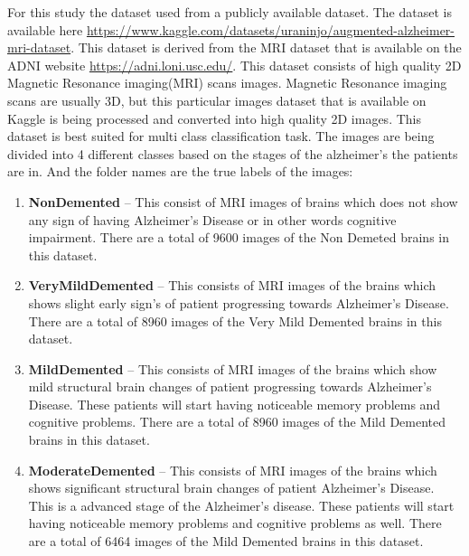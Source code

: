 \documentclass[12pt,onecolumn]{report}
\begin{document}
For this study the dataset used from a publicly available dataset. The dataset is available here \url{https://www.kaggle.com/datasets/uraninjo/augmented-alzheimer-mri-dataset}. This dataset is derived from the MRI dataset that is available on the ADNI website \url{https://adni.loni.usc.edu/}. This dataset consists of high quality 2D Magnetic Resonance imaging(MRI) scans images. Magnetic Resonance imaging scans are usually 3D, but this particular images dataset that is available on Kaggle is being processed and converted into high quality 2D images. This dataset is best suited for multi class classification task. The images are being divided into 4 different classes based on the stages of the alzheimer's the patients are in. And the folder names are the true labels of the images:
\begin{enumerate}
    \item \textbf{NonDemented} – This consist of MRI images of brains which does not show any sign of having Alzheimer’s Disease or in other words cognitive impairment. There are a total of 9600 images of the Non Demeted brains in this dataset.
    \item \textbf{VeryMildDemented} – This consists of MRI images of the brains which shows slight early sign's of patient progressing towards Alzheimer’s Disease. There are a total of 8960 images of the Very Mild Demented brains in this dataset.
    \item \textbf{MildDemented} – This consists of MRI images of the brains which show mild structural brain changes of patient progressing towards Alzheimer’s Disease. These patients will start having noticeable memory problems and cognitive problems. There are a total of 8960 images of the Mild Demented brains in this dataset.
    \item \textbf{ModerateDemented} – This consists of MRI images of the brains which shows significant structural brain changes of patient Alzheimer’s Disease. This is a advanced stage of the Alzheimer’s disease. These patients will start having noticeable memory problems and cognitive problems as well. There are a total of 6464 images of the Mild Demented brains in this dataset.
\end{enumerate}
\end{document}
